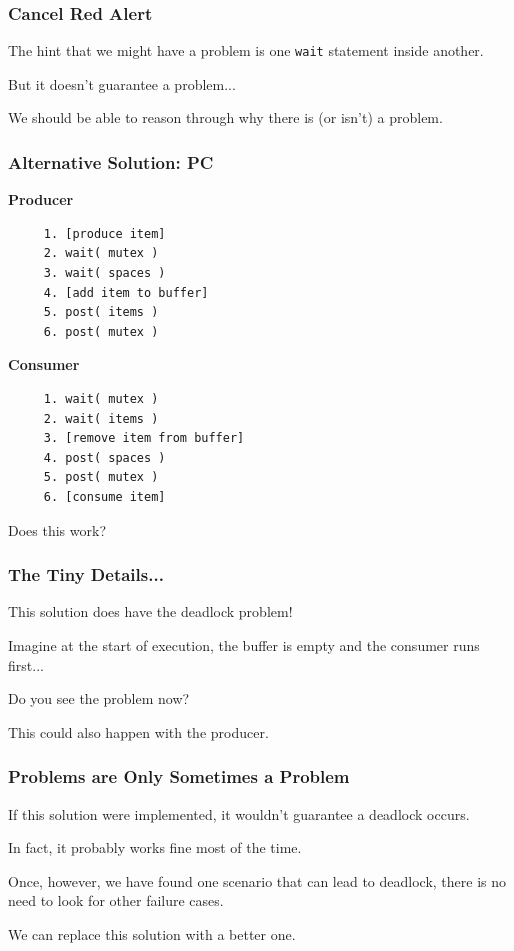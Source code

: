 \begin{frame}
	\frametitle{Cancel Red Alert}

	The hint that we might have a problem is one \texttt{wait} statement inside another.

	But it doesn't guarantee a problem...

	We should be able to reason through why there is (or isn't) a problem.

\end{frame}

\begin{frame}[fragile]
	\frametitle{Alternative Solution: PC}

	\begin{multicols}{2}
		\textbf{Producer}
		\begin{verbatim}
	 1. [produce item]
	 2. wait( mutex )
	 3. wait( spaces )
	 4. [add item to buffer]
	 5. post( items )
	 6. post( mutex )
  		\end{verbatim}
		\columnbreak
		\textbf{Consumer}\vspace{-2em}
		\begin{verbatim}
	 1. wait( mutex )
	 2. wait( items )
	 3. [remove item from buffer]
	 4. post( spaces )
	 5. post( mutex )
	 6. [consume item]
  		\end{verbatim}
	\end{multicols}
	\vspace{-2em}

	Does this work?

\end{frame}

\begin{frame}
	\frametitle{The Tiny Details...}

	This solution does have the deadlock problem!

	Imagine at the start of execution, the buffer is empty and the consumer runs first...

	Do you see the problem now?

	This could also happen with the producer.

\end{frame}

\begin{frame}
	\frametitle{Problems are Only Sometimes a Problem}

	If this solution were implemented, it wouldn't guarantee a deadlock occurs.

	In fact, it probably works fine most of the time.


	Once, however, we have found one scenario that can lead to deadlock, there is no need to look for other failure cases.

	We can replace this solution with a better one.

\end{frame}

